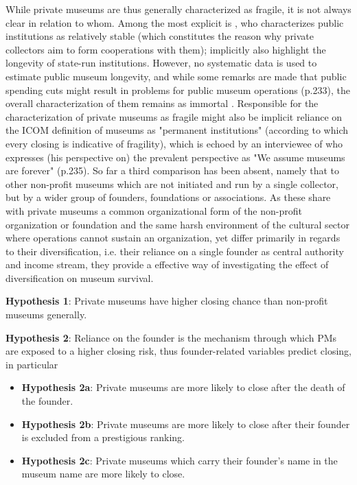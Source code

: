 \documentclass[12pt]{article}
\begin{document}
While private museums are thus generally characterized as fragile, it is not always clear in relation to whom.
Among the most explicit is \textcite{Walker_2019_collector}, who characterizes public institutions as relatively stable (which constitutes the reason why private collectors aim to form cooperations with them); \textcite{Bechtler_Imhof_2018_future} implicitly also highlight the longevity of state-run institutions.
However, no systematic data is used to estimate public museum longevity, and while some
remarks are made that public spending cuts might result in problems for public museum operations (p.233), the overall characterization of them remains as immortal \parencite{Frey_Meier_2002_beyeler}.
Responsible for the characterization of private museums as fragile might also be implicit reliance on the ICOM definition \parencite{ICOM_2024_definition} of museums as "permanent institutions" (according to which every closing is indicative of fragility), which is echoed by an interviewee of \textcite{Walker_2019_collector} who expresses (his perspective on) the prevalent perspective as "We assume museums are forever" (p.235).
So far a third comparison has been absent, namely that to other non-profit museums which are not initiated and run by a single collector, but by a wider group of founders, foundations or associations.
As these share with private museums a common organizational form of the non-profit organization or foundation  and the same harsh environment of the cultural sector where operations cannot sustain an organization, yet differ primarily in regards to their diversification, i.e. their reliance on a single founder as central authority and income stream, they provide a effective way of investigating the effect of diversification on museum survival. 


\textbf{Hypothesis 1}: Private museums have higher closing chance than non-profit museums generally.

\textbf{Hypothesis 2}: Reliance on the founder is the mechanism through which PMs are exposed to a higher closing risk, thus founder-related variables predict closing, in particular
\begin{itemize}
\item \textbf{Hypothesis 2a}: Private museums are more likely to close after the death of the founder.
\item \textbf{Hypothesis 2b}: Private museums are more likely to close after their founder is excluded from a prestigious ranking.
\item \textbf{Hypothesis 2c}: Private museums which carry their founder's name in the museum name are more likely to close.
\end{itemize}
\end{document}
